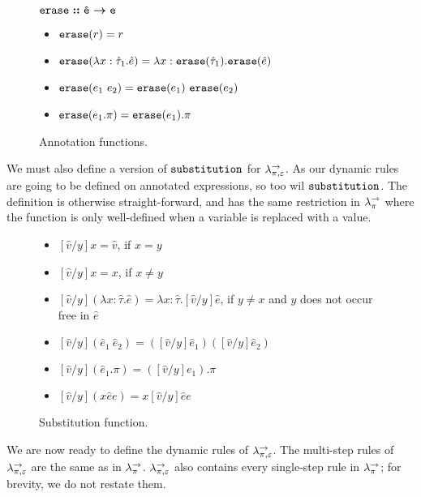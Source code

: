 \begin{figure}[h]
$\bm{\mathtt{erase :: \hat e \rightarrow e}}$
\begin{itemize}
	\setlength\itemsep{-0.7em}
	\item[] $\mathtt{erase}(r) = r$
	\item[] $\mathtt{erase}(\lambda x: \hat \tau_1 . \hat e) = \lambda x: \mathtt{erase}(\hat \tau_1) . \mathtt{erase}(\hat e)$
	\item[] $\mathtt{erase}(e_1~e_2) = \mathtt{erase}(e_1)~\mathtt{erase}(e_2)$
	\item[] $\mathtt{erase}(e_1.\pi) = \mathtt{erase}(e_1).\pi$
\end{itemize}

\vspace{-7pt}
\caption{Annotation functions.}
\label{This is the label.}
\end{figure}

We must also define a version of $\mathtt{substitution}$ for $\lambda^{\rightarrow}_{\pi, \varepsilon}$. As our dynamic rules are going to be defined on annotated expressions, so too wil $\mathtt{substitution}$. The definition is otherwise straight-forward, and has the same restriction in $\lambda^{\rightarrow}_{\pi}$ where the function is only well-defined when a variable is replaced with a value.

\begin{figure}[h]


\begin{itemize}
	\setlength\itemsep{-0.7em}
	\item[] $[\hat v/y]x = \hat v$, if $x = y$
	\item[] $[\hat v/y]x = x$, if $x \neq y$
	\item[] $[\hat v/y](\lambda x: \hat \tau. \hat e) = \lambda x: \hat \tau.[\hat v/y]\hat e$, if $y \neq x$ and $y$ does not occur free in $\hat e$
	\item[] $[\hat v/y](\hat e_1~\hat e_2) = ([\hat v/y]\hat e_1)([\hat v/y]\hat e_2)$
	\item[] $[\hat v/y](\hat e_1.\pi) = ([\hat v/y]e_1).\pi$
	\item[] $[\hat v/y]({x}{\hat e}{e}) = {x}{[\hat v/y]\hat e}{e}$
\end{itemize}

\vspace{-7pt}
\caption{Substitution function.}
\label{This is the label.}
\end{figure}

We are now ready to define the dynamic rules of $\lambda^{\rightarrow}_{\pi, \varepsilon}$. The multi-step rules of $\lambda^{\rightarrow}_{\pi, \varepsilon}$ are the same as in $\lambda^{\rightarrow}_{\pi}$. $\lambda^{\rightarrow}_{\pi, \varepsilon}$ also contains every single-step rule in $\lambda^{\rightarrow}_{\pi}$; for brevity, we do not restate them.

